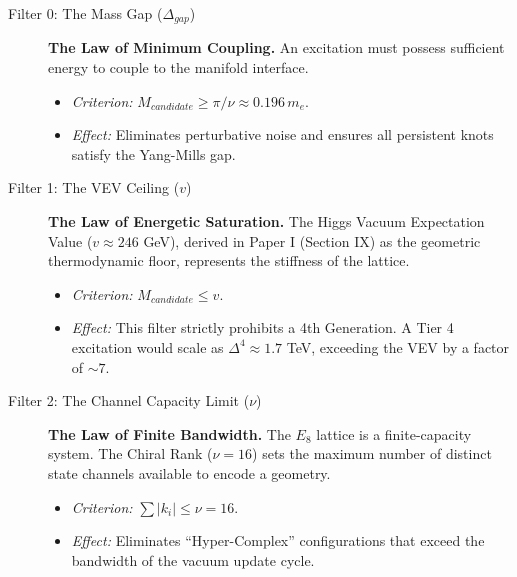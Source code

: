 \begin{description}
    \item[Filter 0: The Mass Gap ($\Delta_{gap}$)] \textbf{The Law of Minimum Coupling.} An excitation must possess sufficient energy to couple to the manifold interface.
    \begin{itemize}
        \item \textit{Criterion:} $M_{candidate} \ge \pi / \nu \approx 0.196 \, m_e$.
        \item \textit{Effect:} Eliminates perturbative noise and ensures all persistent knots satisfy the Yang-Mills gap.
    \end{itemize}

    \item[Filter 1: The VEV Ceiling ($v$)] \textbf{The Law of Energetic Saturation.} The Higgs Vacuum Expectation Value ($v \approx 246$ GeV), derived in Paper I (Section IX) as the geometric thermodynamic floor, represents the stiffness of the lattice.
    \begin{itemize}
        \item \textit{Criterion:} $M_{candidate} \le v$.
        \item \textit{Effect:} This filter strictly prohibits a 4th Generation. A Tier 4 excitation would scale as $\Delta^4 \approx 1.7$ TeV, exceeding the VEV by a factor of $\sim 7$.
    \end{itemize}

    \item[Filter 2: The Channel Capacity Limit ($\nu$)] \textbf{The Law of Finite Bandwidth.} The $E_8$ lattice is a finite-capacity system. The Chiral Rank ($\nu=16$) sets the maximum number of distinct state channels available to encode a geometry.
    \begin{itemize}
        \item \textit{Criterion:} $\sum |k_i| \le \nu = 16$.
        \item \textit{Effect:} Eliminates ``Hyper-Complex'' configurations that exceed the bandwidth of the vacuum update cycle.
    \end{itemize}


\end{description}
